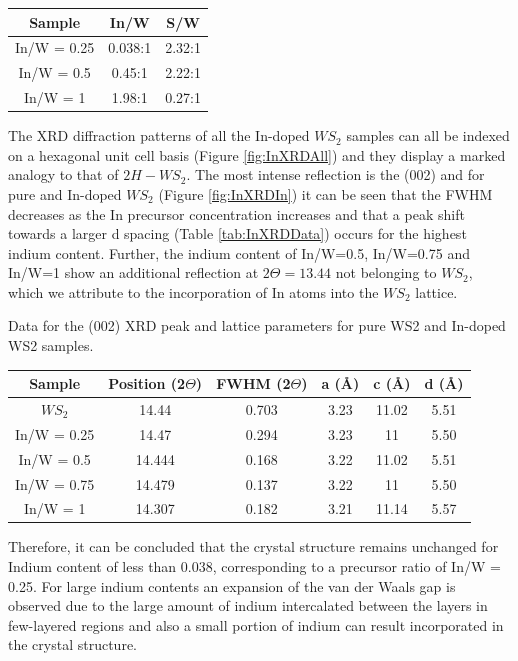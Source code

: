 \begin{center}
\begin{tabular}{c|cc}

Sample 		& In/W 		& S/W\\\hline
In/W = 0.25 & 0.038:1 	& 2.32:1\\
In/W = 0.5	& 0.45:1	& 2.22:1\\
In/W = 1	& 1.98:1	& 0.27:1

\end{tabular}
\end{center}

The XRD diffraction patterns of all the In-doped $WS_2$ samples can all be indexed on a hexagonal unit cell basis (Figure \ref{fig:InXRDAll}) and they display a marked analogy to that of $2H-WS_2$. The most intense reflection is the (002) and for pure and In-doped $WS_2$ (Figure \ref{fig:InXRDIn}) it can be seen that the FWHM decreases as the In precursor concentration increases and that a peak shift towards a larger d spacing (Table \ref{tab:InXRDData}) occurs for the highest indium content. Further, the indium content of In/W=0.5, In/W=0.75 and In/W=1 show an additional reflection at $2{\Theta}=13.44$ not belonging to $WS_2$, which we attribute to the incorporation of In atoms into the $WS_2$ lattice.

\begin{table}[!ht]
\caption{Data for the (002) XRD peak and lattice parameters for pure WS2 and In-doped WS2 samples.}
\label{tab:InXRDData}
\end{table}

\begin{center}
\begin{tabular}{c|ccccc}

Sample 		& Position (2$\Theta$)	& FWHM (2$\Theta$)	& a (\r{A})	& c (\r{A})	& d (\r{A})	\\\hline
$WS_2$	 	& 14.44 				& 0.703				& 3.23		& 11.02		& 5.51		\\
In/W = 0.25	& 14.47					& 0.294				& 3.23		& 11		& 5.50		\\
In/W = 0.5	& 14.444				& 0.168				& 3.22		& 11.02		& 5.51		\\
In/W = 0.75	& 14.479				& 0.137				& 3.22		& 11		& 5.50		\\
In/W = 1	& 14.307				& 0.182				& 3.21		& 11.14		& 5.57

\end{tabular}
\end{center}

Therefore, it can be concluded that the crystal structure remains unchanged for Indium content of less than 0.038, corresponding to a precursor ratio of In/W = 0.25. For large indium contents an expansion of the van der Waals gap is observed due to the large amount of indium intercalated between the layers in few-layered regions and also a small portion of indium can result incorporated in the crystal structure. 

